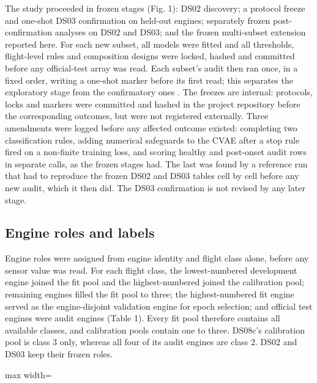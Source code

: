 \documentclass[preprint,11pt,a4paper]{elsarticle}
\begin{document}
The study proceeded in frozen stages (Fig. 1): DS02 discovery; a protocol freeze and one-shot DS03 confirmation on held-out engines; separately frozen post-confirmation analyses on DS02 and DS03; and the frozen multi-subset extension reported here. For each new subset, all models were fitted and all thresholds, flight-level rules and composition designs were locked, hashed and committed before any official-test array was read. Each subset's audit then ran once, in a fixed order, writing a one-shot marker before its first read; this separates the exploratory stage from the confirmatory ones \cite{N33}. The freezes are internal: protocols, locks and markers were committed and hashed in the project repository before the corresponding outcomes, but were not registered externally. Three amendments were logged before any affected outcome existed: completing two classification rules, adding numerical safeguards to the CVAE after a stop rule fired on a non-finite training loss, and scoring healthy and post-onset audit rows in separate calls, as the frozen stages had. The last was found by a reference run that had to reproduce the frozen DS02 and DS03 tables cell by cell before any new audit, which it then did. The DS03 confirmation is not revised by any later stage.

\subsection{Engine roles and labels}

Engine roles were assigned from engine identity and flight class alone, before any sensor value was read. For each flight class, the lowest-numbered development engine joined the fit pool and the highest-numbered joined the calibration pool; remaining engines filled the fit pool to three; the highest-numbered fit engine served as the engine-disjoint validation engine for epoch selection; and official test engines were audit engines (Table 1). Every fit pool therefore contains all available classes, and calibration pools contain one to three. DS08c's calibration pool is class 3 only, whereas all four of its audit engines are class 2. DS02 and DS03 keep their frozen roles.
\begin{table}[htbp]
\centering
\small
\caption{Subsets, fleet families and engine roles, with flight classes, audited healthy and post-onset rows, and the composition volume N.}
\label{tab:1}
\begin{adjustbox}{max width=\textwidth}

\end{adjustbox}
\end{table}
\end{document}
